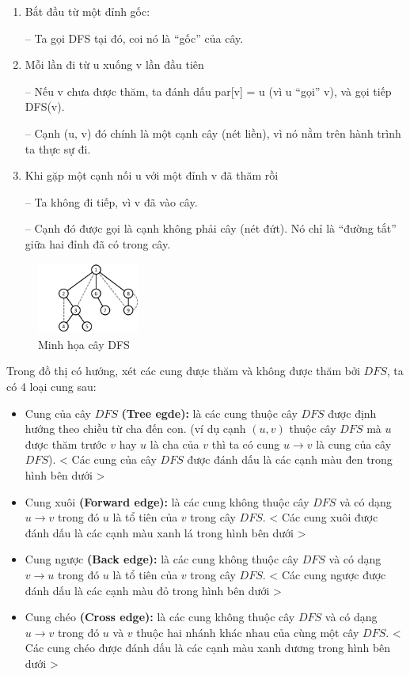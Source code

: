 \documentclass{article}
\begin{document}
\begin{enumerate}
    \item Bắt đầu từ một đỉnh gốc:

    – Ta gọi DFS tại đó, coi nó là “gốc” của cây.
    \item Mỗi lần đi từ u xuống v lần đầu tiên
    
    – Nếu v chưa được thăm, ta đánh dấu par[v] = u (vì u ``gọi'' v), và gọi tiếp DFS(v).
    
    – Cạnh (u, v) đó chính là một cạnh cây (nét liền), vì nó nằm trên hành trình ta thực sự đi.
    \item Khi gặp một cạnh nối u với một đỉnh v đã thăm rồi
    
    – Ta không đi tiếp, vì v đã vào cây.

    – Cạnh đó được gọi là cạnh không phải cây (nét đứt). Nó chỉ là ``đường tắt'' giữa hai đỉnh đã có trong cây.
\end{enumerate}


\begin{figure}[h]
    \centering
    \includegraphics[width=0.3\textwidth]{img/b3/Depth-First-Search-Tree_img1.png}
    \caption{Minh họa cây DFS}    
\end{figure}

Trong đồ thị có hướng, xét các cung được thăm và không được thăm bởi $DFS$, ta có 4 loại cung sau:
\begin{itemize}
    \item Cung của cây $DFS$ \textbf{(Tree egde):} là các cung thuộc cây $DFS$ được định hướng theo chiều từ cha đến con. (ví dụ cạnh $(u, v)$ thuộc cây $DFS$ mà $u$ được thăm trước $v$ hay $u$ là cha của $v$ thì ta có cung $u \rightarrow v$ là cung của cây $DFS$). < Các cung của cây $DFS$ được đánh dấu là các cạnh màu đen trong hình bên dưới >
    \item Cung xuôi \textbf{(Forward edge):} là các cung không thuộc cây $DFS$ và có dạng $u \rightarrow v$ trong đó $u$ là tổ tiên của $v$ trong cây $DFS$. < Các cung xuôi được đánh dấu là các cạnh màu xanh lá trong hình bên dưới >
    \item Cung ngược \textbf{(Back edge):} là các cung không thuộc cây $DFS$ và có dạng $v \rightarrow u$ trong đó $u$ là tổ tiên của $v$ trong cây $DFS$. < Các cung ngược được đánh dấu là các cạnh màu đỏ trong hình bên dưới >
    \item Cung chéo \textbf{(Cross edge):} là các cung không thuộc cây $DFS$ và có dạng $u \rightarrow v$ trong đó $u$ và $v$ thuộc hai nhánh khác nhau của cùng một cây $DFS$. < Các cung chéo được đánh dấu là các cạnh màu xanh dương trong hình bên dưới >
\end{itemize}
\end{document}
